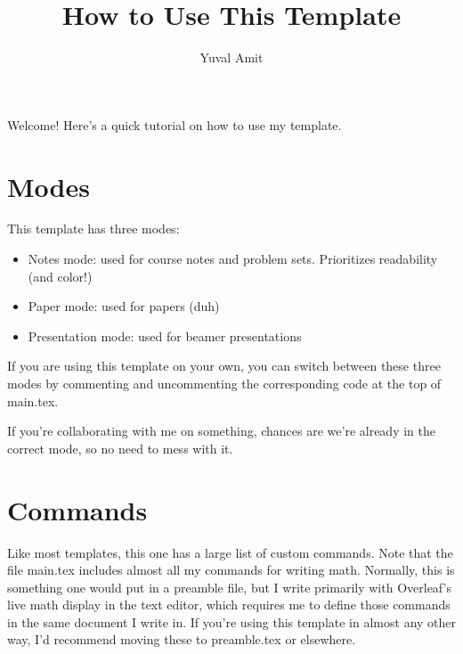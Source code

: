 \documentclass[10pt]{article}
\title{How to Use This Template}
\author{Yuval Amit}
\date{}
\begin{document}
\maketitle

Welcome! Here's a quick tutorial on how to use my template.

\section{Modes}

This template has three modes:
\begin{itemize}
    \item Notes mode: used for course notes and problem sets. Prioritizes readability (and color!)
    \item Paper mode: used for papers (duh)
    \item Presentation mode: used for beamer presentations
\end{itemize}
If you are using this template on your own, you can switch between these three modes by commenting and uncommenting the corresponding code at the top of main.tex.

If you're collaborating with me on something, chances are we're already in the correct mode, so no need to mess with it.

\section{Commands}

Like most templates, this one has a large list of custom commands. Note that the file main.tex includes almost all my commands for writing math. Normally, this is something one would put in a preamble file, but I write primarily with Overleaf's live math display in the text editor, which requires me to define those commands in the same document I write in. If you're using this template in almost any other way, I'd recommend moving these to preamble.tex or elsewhere.
\end{document}
